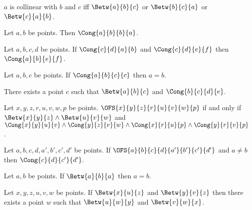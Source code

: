 \begin{definition}\label{collinear}
    $a$ is collinear with $b$ and $c$ iff $\Betw{a}{b}{c}$ or $\Betw{b}{c}{a}$ or $\Betw{c}{a}{b}$.
\end{definition}

\begin{axiom}\label{cong_refl_swap} %
    Let $a, b$ be points.
    Then $\Cong{a}{b}{b}{a}$.
\end{axiom}

\begin{axiom}\label{cong_pseudotransitive} %
    Let $a, b, c, d$ be points.
    If $\Cong{c}{d}{a}{b}$ and $\Cong{c}{d}{e}{f}$ then $\Cong{a}{b}{e}{f}$.
\end{axiom}

\begin{axiom}\label{cong_id} %
    Let $a, b, c$ be points.
    If $\Cong{a}{b}{c}{c}$ then $a = b$.
\end{axiom}


\begin{axiom}\label{segment_construction} %
    There exists a point $c$ such that $\Betw{a}{b}{c}$ and $\Cong{b}{c}{d}{e}$.
\end{axiom}


\begin{definition}\label{ofs}
    Let $x,y,z,r,u,v,w,p$ be points.
    $\OFS{x}{y}{z}{r}{u}{v}{w}{p}$ if and only if
    $\Betw{x}{y}{z}
      \land \Betw{u}{v}{w}$
    and
    $\Cong{x}{y}{u}{v}
      \land \Cong{y}{z}{v}{w}
      \land \Cong{x}{r}{u}{p}
      \land \Cong{y}{r}{v}{p}$.
\end{definition}


\begin{axiom}\label{five_segment} %
    Let $a,b,c,d,a',b',c',d'$ be points.
    If $\OFS{a}{b}{c}{d}{a'}{b'}{c'}{d'}$ and
    $a \neq b$ then $\Cong{c}{d}{c'}{d'}$.
\end{axiom}


\begin{axiom}\label{betw_id}
    Let $a,b$ be points.
    If $\Betw{a}{b}{a}$ then $a = b$.
\end{axiom}


\begin{axiom}\label{innerpasch} %
    Let $x,y,z,u,v,w$ be points.
    If $\Betw{x}{u}{z}$ and $\Betw{y}{v}{z}$ then there exists a point $w$
    such that $\Betw{u}{w}{y}$ and $\Betw{v}{w}{x}$.
\end{axiom}


